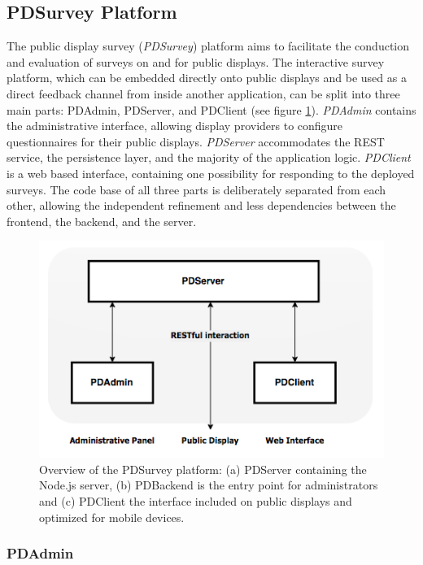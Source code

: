 

\subsection{PDSurvey Platform}

	The public display survey (\textit{PDSurvey}) platform aims to facilitate the conduction and evaluation of surveys on and for public displays. 
	The interactive survey platform, which can be embedded directly onto public displays and be used as a direct feedback channel from inside another application, can be split into three main parts: PDAdmin, PDServer, and PDClient (see figure \ref{fig:4-pdsurvey-platform}). \textit{PDAdmin} contains the administrative interface, allowing display providers to configure questionnaires for their public displays. \textit{PDServer} accommodates the REST service, the persistence layer, and the majority of the application logic. \textit{PDClient} is a web based interface, containing one possibility for responding to the deployed surveys. 
	The code base of all three parts is deliberately separated from each other, allowing the independent refinement and less dependencies between the frontend, the backend, and the server.

	\begin{figure}[btph]
	    \begin{center}
	        \includegraphics[width=.7\columnwidth]{img/4_implementation/4-overview}
	    \end{center}
	 \caption[Overview of the PDSurvey platform]{Overview of the PDSurvey platform: (a) PDServer containing the Node.js server, (b) PDBackend is the entry point for administrators and (c) PDClient the interface included on public displays and optimized for mobile devices.}
	 \label{fig:4-pdsurvey-platform}
	\end{figure}



	\subsubsection{PDAdmin}


